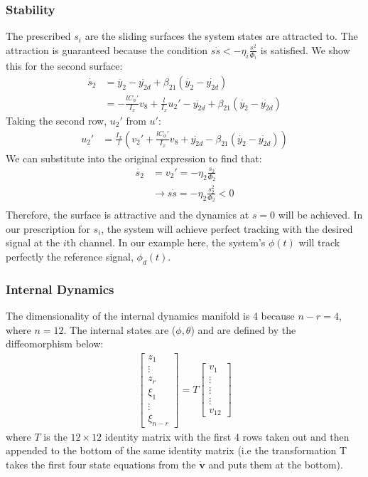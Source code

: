 \documentclass[conference]{IEEEtran}
\begin{document}
\subsubsection{Stability}
The prescribed $s_i$ are the sliding surfaces the system states are attracted to. The attraction is guaranteed because the condition $s\dot{s} < -\eta_i\frac{s^2}{\Phi_i}$ is satisfied. We show this for the second surface:
\begin{align*}
\dot{s_2} &=  \ddot{y_{2}} - \ddot{y_{2d}} + \beta_{21}(\dot{y_2} - \dot{y_{2d}}) \\
&= -\frac{lC_\phi'}{I_x}v_8 + \frac{l}{I_x} u_2' - \ddot{y_{2d}} + \beta_{21}(\dot{y_2} - \dot{y_{2d}})
\end{align*}
Taking the second row, $u_2'$ from $u'$:
\begin{align*}
u_2' &= \frac{I_x}{l} (v_2' + \frac{lC_\phi'}{I_x}v_8 + \ddot{y_{2d}} - \beta_{21}(\dot{y_2} - \dot{y_{2d}}) )
\end{align*}
We can substitute into the original expression to find that:
\begin{align*}
\dot{s_2} &=  v_2' = -\eta_2\frac{s_2}{\Phi_2}  \\
&\longrightarrow s\dot{s} = -\eta_2\frac{s_2^2}{\Phi_2} < 0  \\
\end{align*}
Therefore, the surface is attractive and the dynamics at $s=0$ will be achieved. In our prescription for $s_i$, the system will achieve perfect tracking with the desired signal at the $i$th channel. In our example here, the system's $\phi(t)$ will track perfectly the reference signal, $\phi_d(t)$.


\subsubsection{Internal Dynamics}
The dimensionality of the internal dynamics manifold is 4 because $n-r = 4$, where $n = 12$. The internal states are ($\phi,\theta$) and are defined by the diffeomorphism below:
\begin{align*}
\begin{bmatrix}
z_1 \\ \vdots \\ z_r \\ \xi_1 \\ \vdots \\ \xi_{n-r}
\end{bmatrix} = 
T
\begin{bmatrix}
v_1 \\ \vdots \\ \vdots \\ \vdots \\ v_{12}
\end{bmatrix}
\end{align*}
where $T$ is the $12\times12$ identity matrix with the first 4 rows taken out and then appended to the bottom of the same identity matrix (i.e the transformation T takes the first four state equations from the $\dot{\mathbf{v}}$ and puts them at the bottom).
\end{document}
